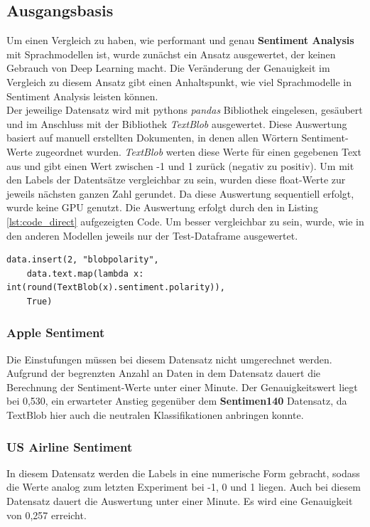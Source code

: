 \subsection{Ausgangsbasis}
Um einen Vergleich zu haben, wie performant und genau \textbf{Sentiment Analysis} mit Sprachmodellen ist, wurde zun\"achst ein Ansatz ausgewertet, der keinen Gebrauch von Deep Learning macht. Die Ver\"anderung der Genauigkeit im Vergleich zu diesem Ansatz gibt einen Anhaltspunkt, wie viel Sprachmodelle in Sentiment Analysis leisten k\"onnen.\\
Der jeweilige Datensatz wird mit pythons \textit{pandas} Bibliothek eingelesen, ges\"aubert und im Anschluss mit der Bibliothek \textit{TextBlob} ausgewertet. Diese Auswertung basiert auf manuell erstellten Dokumenten, in denen allen W\"ortern Sentiment-Werte zugeordnet wurden. \textit{TextBlob} werten diese Werte f\"ur einen gegebenen Text aus und gibt einen Wert zwischen -1 und 1 zur\"uck (negativ zu positiv). Um mit den Labels der Datents\"atze vergleichbar zu sein, wurden diese float-Werte zur jeweils n\"achsten ganzen Zahl gerundet. Da diese Auswertung sequentiell erfolgt, wurde keine GPU genutzt. Die Auswertung erfolgt durch den in Listing \ref{lst:code_direct} aufgezeigten Code. Um besser vergleichbar zu sein, wurde, wie in den anderen Modellen jeweils nur der Test-Dataframe ausgewertet.
\lstset{language=Python}
\lstset{frame=lines}
\lstset{captionpos=b}
\lstset{basicstyle=\footnotesize}
\begin{lstlisting}
data.insert(2, "blobpolarity", 
	data.text.map(lambda x: int(round(TextBlob(x).sentiment.polarity)), 
	True)
\end{lstlisting}

\subsubsection*{Apple Sentiment}
Die Einstufungen m\"ussen bei diesem Datensatz nicht umgerechnet werden. Aufgrund der begrenzten Anzahl an Daten in dem Datensatz dauert die Berechnung der Sentiment-Werte unter einer Minute. Der Genauigkeitswert liegt bei 0,530, ein erwarteter Anstieg gegen\"uber dem \textbf{Sentimen140} Datensatz, da TextBlob hier auch die neutralen Klassifikationen anbringen konnte.

\subsubsection*{US Airline Sentiment}
In diesem Datensatz werden die Labels in eine numerische Form gebracht, sodass die Werte analog zum letzten Experiment bei -1, 0 und 1 liegen. Auch bei diesem Datensatz dauert die Auswertung unter einer Minute. Es wird eine Genauigkeit von 0,257 erreicht.

